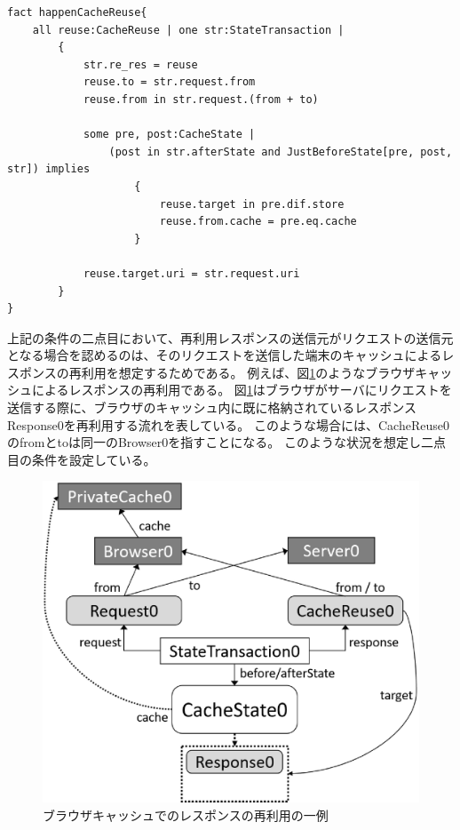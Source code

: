 \documentclass[12pt,a4paper]{jbook}
\begin{document}
\begin{lstlisting}[caption=CacheReuseの発生条件, label=code:happenCacheReuse]
fact happenCacheReuse{
	all reuse:CacheReuse | one str:StateTransaction |
		{
			str.re_res = reuse
			reuse.to = str.request.from
			reuse.from in str.request.(from + to)

			some pre, post:CacheState |
				(post in str.afterState and JustBeforeState[pre, post, str]) implies
					{
						reuse.target in pre.dif.store
						reuse.from.cache = pre.eq.cache
					}

			reuse.target.uri = str.request.uri
		}
}
\end{lstlisting}

上記の条件の二点目において、再利用レスポンスの送信元がリクエストの送信元となる場合を認めるのは、そのリクエストを送信した端末のキャッシュによるレスポンスの再利用を想定するためである。
例えば、図\ref{fig:BrowserCacheReuse}のようなブラウザキャッシュによるレスポンスの再利用である。
図\ref{fig:BrowserCacheReuse}はブラウザがサーバにリクエストを送信する際に、ブラウザのキャッシュ内に既に格納されているレスポンスResponse0を再利用する流れを表している。
このような場合には、CacheReuse0のfromとtoは同一のBrowser0を指すことになる。
このような状況を想定し二点目の条件を設定している。

\begin{figure}[htb]
\centering
\includegraphics[width=350pt]{./fig/BrowserCacheReuse.eps}
\caption{ブラウザキャッシュでのレスポンスの再利用の一例}
\label{fig:BrowserCacheReuse}
\end{figure}
\end{document}
